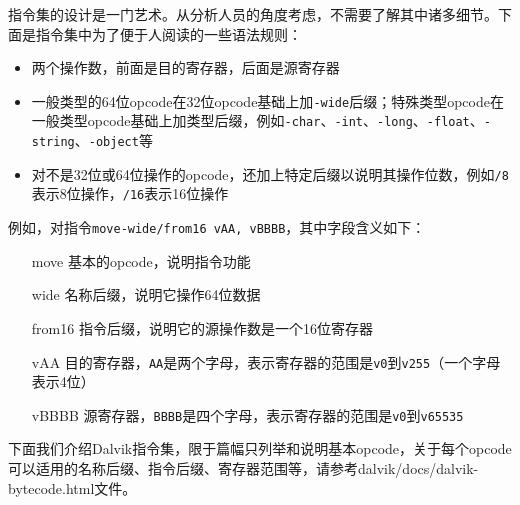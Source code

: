 指令集的设计是一门艺术。从分析人员的角度考虑，不需要了解其中诸多细节。下面是指令集中为了便于人阅读的一些语法规则：
\begin{itemize}
  \item 两个操作数，前面是目的寄存器，后面是源寄存器
  \item 一般类型的64位opcode在32位opcode基础上加\lstinline!-wide!后缀；特殊类型opcode在一般类型opcode基础上加类型后缀，例如\lstinline!-char!、\lstinline!-int!、\lstinline!-long!、\lstinline!-float!、\lstinline!-string!、\lstinline!-object!等
  \item 对不是32位或64位操作的opcode，还加上特定后缀以说明其操作位数，例如\lstinline!/8!表示8位操作，\lstinline!/16!表示16位操作
\end{itemize}
例如，对指令\lstinline!move-wide/from16 vAA, vBBBB!，其中字段含义如下：
\begin{itemize}
  \item[move] 基本的opcode，说明指令功能
  \item[wide] 名称后缀，说明它操作64位数据
  \item[from16] 指令后缀，说明它的源操作数是一个16位寄存器
  \item[vAA] 目的寄存器，\lstinline!AA!是两个字母，表示寄存器的范围是\lstinline!v0!到\lstinline!v255!（一个字母表示4位）
  \item[vBBBB] 源寄存器，\lstinline!BBBB!是四个字母，表示寄存器的范围是\lstinline!v0!到\lstinline!v65535!
\end{itemize}
下面我们介绍Dalvik指令集，限于篇幅只列举和说明基本opcode，关于每个opcode可以适用的名称后缀、指令后缀、寄存器范围等，请参考dalvik/docs/dalvik-bytecode.html文件。
